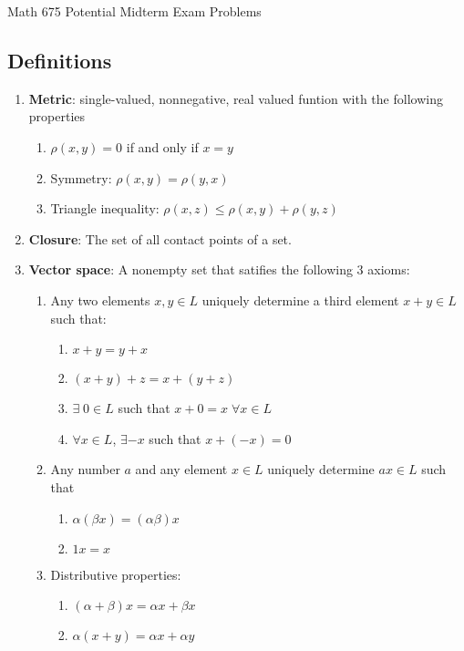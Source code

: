 \documentclass[5pt,letterpaper,reqno]{amsart}
\begin{document}
\thispagestyle{empty}
\centerline{\Large Math 675 Potential Midterm Exam Problems}
\subsection*{Definitions}
\begin{enumerate}[1.]
\item \textbf{Metric}: single-valued, nonnegative, real valued funtion with the following properties
\begin{enumerate}
\item $\rho(x,y) = 0$ if and only if $x = y$
\item Symmetry: $\rho(x,y) = \rho(y,x)$
\item Triangle inequality: $\rho(x,z) \leq \rho(x,y) + \rho(y,z)$
\end{enumerate}
\item \textbf{Closure}: The set of all contact points of a set.
\item \textbf{Vector space}: A nonempty set that satifies the following 3 axioms:
    \begin{enumerate}
        \item Any two elements $x,y \in L$ uniquely determine a third element $x+y \in L$ such that:
        \begin{enumerate}
            \item $x+y = y+x$
            \item $(x+y)+z = x+(y+z)$
            \item $\exists \; 0 \in L$ such that $x+0=x \; \forall x \in L$
            \item $\forall x \in L$, $\exists -x$ such that $x + (-x) = 0$
        \end{enumerate}
        \item Any number $a$ and any element $x \in L$ uniquely determine $ax \in L$ such that
        \begin{enumerate}
            \item $\alpha(\beta x) = (\alpha\beta)x$
            \item $1 x = x$
        \end{enumerate}
        \item Distributive properties:
        \begin{enumerate}
            \item $(\alpha + \beta)x = \alpha x + \beta x$
            \item $\alpha(x + y) = \alpha x + \alpha y$
        \end{enumerate}

\end{enumerate}
\end{enumerate}
\end{document}

